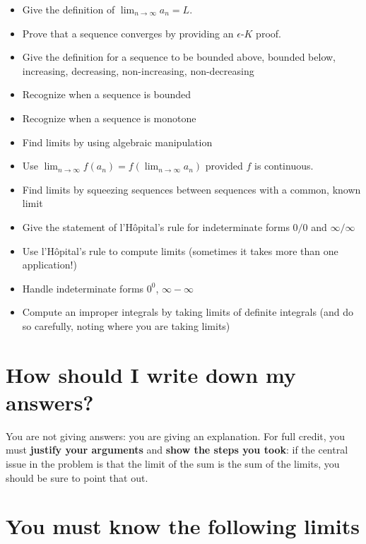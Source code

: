\documentclass[12pt]{article}
\theoremstyle{definition}
\newcommand{\limn}{\displaystyle\lim_{n \to \infty}}
\begin{document}
\begin{multicols}{2}
\begin{itemize}
\item Give the definition of $\limn a_n = L$.
\item Prove that a sequence converges by providing an $\epsilon$-$K$ proof.
\item Give the definition for a sequence to be bounded above, bounded
  below, increasing, decreasing, non-increasing, non-decreasing
\item Recognize when a sequence is bounded
\item Recognize when a sequence is monotone
\item Find limits by using algebraic manipulation
\item Use $\limn f(a_n) = f(\limn a_n)$ provided $f$ is continuous.
\item Find limits by squeezing sequences between sequences with a
  common, known limit
\item Give the statement of l'H\^opital's rule for indeterminate forms $0/0$ and $\infty/\infty$
\item Use l'H\^opital's rule to compute limits (sometimes it takes more than one application!)
\item Handle indeterminate forms $0^0$, $\infty - \infty$
\item Compute an improper integrals by taking limits of definite integrals (and do so carefully, noting where you are taking limits)
\end{itemize}
\end{multicols}

\section*{How should I write down my answers?}

You are not giving answers: you are giving an explanation.  For full
credit, you must \textbf{justify your arguments} and \textbf{show the
  steps you took}: if the central issue in the problem is that the
limit of the sum is the sum of the limits, you should be sure to point
that out.

\section*{You must know the following limits}
\end{document}

